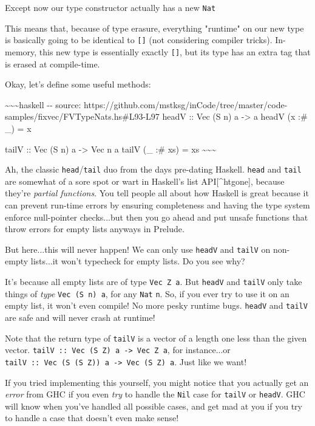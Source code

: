 \documentclass[]{article}
\begin{document}
Except now our type constructor actually has a new \texttt{Nat}

This means that, because of type erasure, everything "runtime" on our new type
is basically going to be identical to \texttt{{[}{]}} (not considering compiler
tricks). In-memory, this new type is essentially exactly \texttt{{[}{]}}, but
its type has an extra tag that is erased at compile-time.

Okay, let's define some useful methods:

\textasciitilde{}\textasciitilde{}\textasciitilde{}haskell -\/- source:
https://github.com/mstksg/inCode/tree/master/code-samples/fixvec/FVTypeNats.hs\#L93-L97
headV :: Vec (S n) a -\textgreater{} a headV (x :\# \_) = x

tailV :: Vec (S n) a -\textgreater{} Vec n a tailV (\_ :\# xs) = xs
\textasciitilde{}\textasciitilde{}\textasciitilde{}

Ah, the classic \texttt{head}/\texttt{tail} duo from the days pre-dating
Haskell. \texttt{head} and \texttt{tail} are somewhat of a sore spot or wart in
Haskell's list API{[}\^{}htgone{]}, because they're \emph{partial functions}.
You tell people all about how Haskell is great because it can prevent run-time
errors by ensuring completeness and having the type system enforce null-pointer
checks...but then you go ahead and put unsafe functions that throw errors for
empty lists anyways in Prelude.

But here...this will never happen! We can only use \texttt{headV} and
\texttt{tailV} on non-empty lists...it won't typecheck for empty lists. Do you
see why?

It's because all empty lists are of type \texttt{Vec\ Z\ a}. But \texttt{headV}
and \texttt{tailV} only take things of \emph{type} \texttt{Vec\ (S\ n)\ a}, for
any \texttt{Nat} \texttt{n}. So, if you ever try to use it on an empty list, it
won't even compile! No more pesky runtime bugs. \texttt{headV} and
\texttt{tailV} are safe and will never crash at runtime!

Note that the return type of \texttt{tailV} is a vector of a length one less
than the given vector.
\texttt{tailV\ ::\ Vec\ (S\ Z)\ a\ -\textgreater{}\ Vec\ Z\ a}, for
instance...or
\texttt{tailV\ ::\ Vec\ (S\ (S\ Z))\ a\ -\textgreater{}\ Vec\ (S\ Z)\ a}. Just
like we want!

If you tried implementing this yourself, you might notice that you actually get
an \emph{error} from GHC if you even \emph{try} to handle the \texttt{Nil} case
for \texttt{tailV} or \texttt{headV}. GHC will know when you've handled all
possible cases, and get mad at you if you try to handle a case that doesn't even
make sense!
\end{document}
